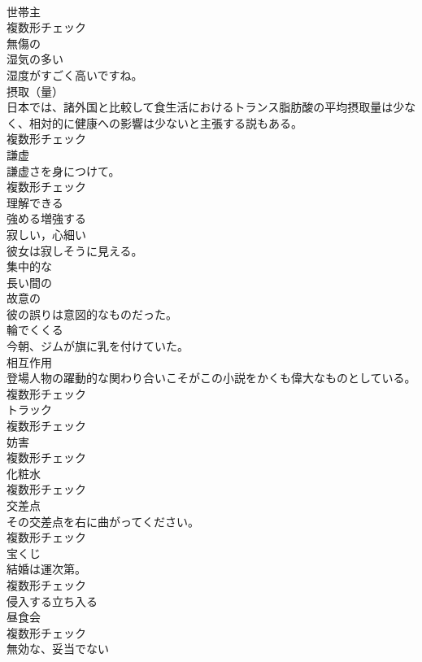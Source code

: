 \documentclass[8pt]{extreport}
\begin{document}
\begin{CJK}{UTF8}{min}
\\	[名詞]	世帯主	
\\	複数形チェック
\\	[形容詞]	無傷の	
\\	[形容詞]	湿気の多い	
\\	湿度がすごく高いですね。	
\\	[名詞]	摂取（量）	
\\	日本では、諸外国と比較して食生活におけるトランス脂肪酸の平均摂取量は少なく、相対的に健康への影響は少ないと主張する説もある。	
\\	複数形チェック
\\	[名詞]	謙虚	
\\	謙虚さを身につけて。	
\\	複数形チェック
\\	[形容詞]	理解できる	
\\	[動詞]	強める増強する	
\\	[形容詞]	寂しい，心細い	
\\	彼女は寂しそうに見える。	
\\	[形容詞]	集中的な	
\\	[形容詞]	⻑い間の	
\\	[形容詞]	故意の	
\\	彼の誤りは意図的なものだった。	
\\	[動詞]	輪でくくる	
\\	今朝、ジムが旗に乳を付けていた。	
\\	[名詞]	相互作用	
\\	登場人物の躍動的な関わり合いこそがこの小説をかくも偉大なものとしている。	
\\	複数形チェック
\\	[名詞]	トラック	
\\	複数形チェック
\\	[名詞]	妨害	
\\	複数形チェック
\\	[名詞]	化粧水	
\\	複数形チェック
\\	[名詞]	交差点	
\\	その交差点を右に曲がってください。	
\\	複数形チェック
\\	[名詞]	宝くじ	
\\	結婚は運次第。	
\\	複数形チェック
\\	[動詞]	侵入する立ち入る	
\\	[名詞]	昼食会	
\\	複数形チェック
\\	[形容詞]	無効な、妥当でない	

\end{CJK}
\end{document}
